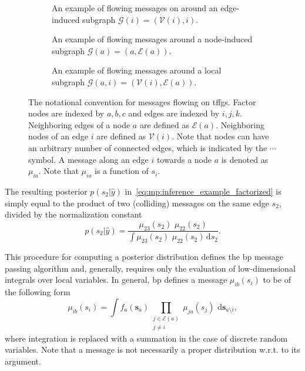 \begin{figure}
  \centering
  \begin{subfigure}[t]{0.275\textwidth}
    \centering
    \resizebox{\textwidth}{!}{}
    \caption{An example of flowing messages on around an edge-induced subgraph $\mathcal{G}(i) = (\mathcal{V}(i), i)$.}
    \label{fig:mp:g_i_msgs}
  \end{subfigure}
  \hfill
  \begin{subfigure}[t]{0.295\textwidth}
    \centering
    \resizebox{0.9\textwidth}{!}{}
    \caption{An example of flowing messages around a node-induced subgraph $\mathcal{G}(a) = (a, \mathcal{E}(a))$.}
    \label{fig:mp:g_a_msgs}
  \end{subfigure}
  \hfill
  \begin{subfigure}[t]{0.335\textwidth}
    \centering
    \resizebox{\textwidth}{!}{}
    \caption{An example of flowing messages around a local subgraph $\mathcal{G}(a, i) = (\mathcal{V}(i), \mathcal{E}(a))$.}
    \label{fig:mp:g_a_i_msgs}
  \end{subfigure}
  \caption{The notational convention for messages flowing on \acp{tffg}.
    Factor nodes are indexed by $a, b, c$ and edges are indexed by $i, j, k$.
    Neighboring edges of a node $a$ are defined as $\mathcal{E}(a)$.
    Neighboring nodes of an edge $i$ are defined as $\mathcal{V}(i)$.
    Note that nodes can have an arbitrary number of connected edges, which is indicated by the
    $\cdots$ symbol.
    A message along an edge $i$ towards a node $a$ is denoted as $\mu_{ia}$.
    Note that $\mu_{ia}$ is a function of $s_i$.
  }
  \label{fig:mp:notation}
\end{figure}

The resulting posterior $p(s_2\vert\hat{y})$ in~\eqref{eq:mp:inference_example_factorized}
is simply equal to the product of two (colliding) messages on the same edge $s_2$, divided by
the normalization constant \begin{equation} 
    p(s_2\vert\hat{y}) = \frac{\mu_{23}(s_2)\,\,\mu_{22}(s_2)}{\int \mu_{23}(s_2)\,\,\mu_{22}(s_2)\,\mathrm{d}s_2}.
\label{eq:mp:marginal_colliding}
\end{equation}

This procedure for
computing a posterior distribution defines the \ac{bp} message passing algorithm and, generally,
requires only the evaluation of low-dimensional integrals over local variables.
In general, \ac{bp} defines a message $\mu_{ib}(s_i)$ to be of
the following form \begin{equation}
    \label{eq:mp:bp_message} \mu_{ib}(s_i) = \int
    f_a(\bm{s}_a) \prod_{\substack{j \in \mathcal{E}(a)\\j \neq i}} \mu_{ja}(s_j)
    \,\,\mathrm{d}\bm{s}_{a\setminus i},
  \end{equation} where integration is replaced with a summation in the
case of discrete random variables. 
Note that a message is not necessarily a proper distribution w.r.t. to its argument.

